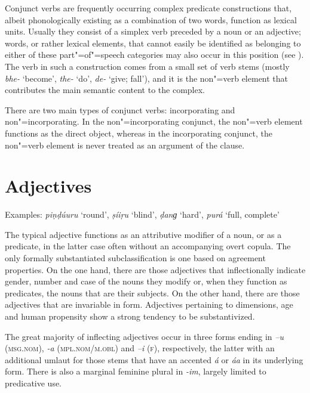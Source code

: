 Conjunct verbs are frequently occurring complex predicate constructions that, albeit phonologically existing as a combination of two words, function as lexical units. Usually they consist of a simplex verb preceded by a noun or an adjective; words, or rather lexical elements, that cannot easily be identified as belonging to either of these part"=of"=speech categories may also occur in this position (see ). The verb in such a construction comes from a small set of verb stems (mostly \textit{bhe-} `become', \textit{the-} `do', \textit{de-} `give; fall'), and it is the non"=verb element that contributes the main semantic content to the complex.


There are two main types of conjunct verbs: incorporating and non"=incorporating. In the non"=incorporating conjunct, the non"=verb element functions as the direct object, whereas in the incorporating conjunct, the non"=verb element is never treated as an argument of the clause.


\section{Adjectives}
\label{sec:3b-4}
Examples: \textit{piṇḍúuru} `round', \textit{ṣíiṛu} `blind', \textit{ḍanɡ} `hard', \textit{purá} `full, complete'


The typical adjective functions as an attributive modifier of a noun, or as a predicate, in the latter case often without an accompanying overt copula. The only formally substantiated subclassification is one based on agreement properties. On the one hand, there are those adjectives that inflectionally indicate gender, number and case of the nouns they modify or, when they function as predicates, the nouns that are their subjects. On the other hand, there are those adjectives that are invariable in form. Adjectives pertaining to dimensions, age and human propensity show a strong tendency to be substantivized.


The great majority of inflecting adjectives occur in three forms ending in \textit{–u} (\textsc{msg.nom}),  \textit{-a} (\textsc{mpl.nom/m.obl}) and \textit{–i} (\textsc{f}), respectively, the latter with an additional umlaut for those stems that have an accented \textit{á} or \textit{áa} in its underlying form. There is also a marginal feminine plural in \textit{-im}, largely limited to predicative use.  


